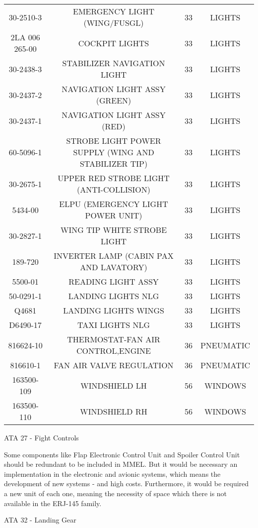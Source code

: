 \begin{table}[htbp]
\begin{tabular}{cccc}
    30-2510-3 & EMERGENCY LIGHT (WING/FUSGL) & 33    & LIGHTS \\
    2LA 006 265-00 & COCKPIT LIGHTS & 33    & LIGHTS \\
    30-2438-3 & STABILIZER NAVIGATION LIGHT & 33    & LIGHTS \\
    30-2437-2 & NAVIGATION LIGHT ASSY (GREEN) & 33    & LIGHTS \\
    30-2437-1 & NAVIGATION LIGHT ASSY (RED) & 33    & LIGHTS \\
    60-5096-1 & STROBE LIGHT POWER SUPPLY (WING AND STABILIZER TIP) & 33    & LIGHTS \\
    30-2675-1 & UPPER RED STROBE LIGHT (ANTI-COLLISION) & 33    & LIGHTS \\
    5434-00 & ELPU (EMERGENCY LIGHT POWER UNIT) & 33    & LIGHTS \\
    30-2827-1 & WING TIP WHITE STROBE LIGHT & 33    & LIGHTS \\
    189-720 & INVERTER LAMP (CABIN PAX AND LAVATORY) & 33    & LIGHTS \\
    5500-01 & READING LIGHT ASSY & 33    & LIGHTS \\
    50-0291-1 & LANDING LIGHTS NLG & 33    & LIGHTS \\
    Q4681 & LANDING LIGHTS WINGS & 33    & LIGHTS \\
    D6490-17 & TAXI LIGHTS NLG & 33    & LIGHTS \\
    816624-10 & THERMOSTAT-FAN AIR CONTROL,ENGINE & 36    & PNEUMATIC \\
    816610-1 & FAN AIR VALVE REGULATION & 36    & PNEUMATIC \\
    163500-109 & WINDSHIELD LH & 56    & WINDOWS \\
    163500-110 & WINDSHIELD RH & 56    & WINDOWS \\
    \bottomrule
    \end{tabular}%
  \label{tab:repComponentList}%
\end{table}%


ATA 27 - Fight Controls


Some components like Flap Electronic Control Unit and Spoiler Control Unit should be redundant  to be included in MMEL. But it would be necessary an implementation in the electronic and avionic systems, which means the development of new systems - and high costs. Furthermore, it would be required a new unit of each one, meaning the necessity of space which there is not available in the ERJ-145 family.


ATA 32 - Landing Gear


